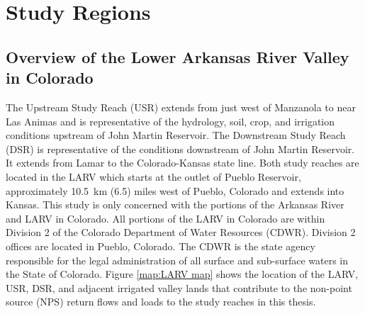 
\renewcommand{\thechapter}{2}
\chapter{Study Regions}
\label{chap:study regions}

\begin{linenumbers}[1]

\section{Overview of the Lower Arkansas River Valley in Colorado}
\label{overview of the lower arkansas river valley in colorado}

The Upstream Study Reach (USR) extends from just west of Manzanola to near Las Animas and is representative of the hydrology, soil, crop, and irrigation conditions upstream of John Martin Reservoir.  The Downstream Study Reach (DSR) is representative of the conditions downstream of John Martin Reservoir.  It extends from Lamar to the Colorado-Kansas state line.  Both study reaches are located in the LARV which starts at the outlet of Pueblo Reservoir, approximately \SI{10.5}{\kilo\meter} (\SI{6.5}{\mile}) miles west of Pueblo, Colorado and extends into Kansas.  This study is only concerned with the portions of the Arkansas River and LARV in Colorado.  All portions of the LARV in Colorado are within Division 2 of the Colorado Department of Water Resources (CDWR).  Division 2 offices are located in Pueblo, Colorado.  The CDWR is the state agency responsible for the legal administration of all surface and sub-surface waters in the State of Colorado.  Figure \ref{map:LARV map} shows the location of the LARV, USR, DSR, and adjacent irrigated valley lands that contribute to the non-point source (NPS) return flows and loads to the study reaches in this thesis.



\end{linenumbers}
